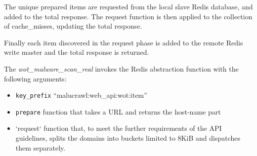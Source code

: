 The unique prepared items are requested from the local slave Redis database, and added to the total response. The request function is then applied to the collection of cache_misses, updating the total response.

Finally each item discovered in the request phase is added to the remote Redis write master and the total response is returned.

The \emph{wot_malware_scan_real} invokes the Redis abstraction function with the following arguments:
\begin{itemize}
    \item \verb`key_prefix` ``malucrawl:web_api:wot:{item}''
    \item \verb`prepare` function that takes a URL and returns the host-name part
    \item \vern`request` function that, to meet the further requirements of the API guidelines, splits the domains into buckets limited to 8KiB and dispatches them separately.
\end{itemize}

